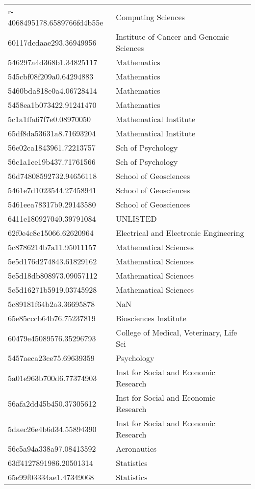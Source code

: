 \begin{tabular}{ll}
r-4068495178.6589766fd4b55e & Computing Sciences \\
60117dcdaae293.36949956 & Institute of Cancer and Genomic Sciences \\
546297a4d368b1.34825117 & Mathematics \\
545cbf08f209a0.64294883 & Mathematics \\
5460bda818e0a4.06728414 & Mathematics \\
5458ea1b073422.91241470 & Mathematics \\
5c1a1ffa67f7e0.08970050 & Mathematical Institute \\
65df8da53631a8.71693204 & Mathematical Institute \\
56e02ca1843961.72213757 & Sch of Psychology \\
56c1a1ee19b437.71761566 & Sch of Psychology \\
56d74808592732.94656118 & School of Geosciences \\
5461e7d1023544.27458941 & School of Geosciences \\
5461eea78317b9.29143580 & School of Geosciences \\
6411e180927040.39791084 & UNLISTED \\
62f0e4c8c15066.62620964 & Electrical and Electronic Engineering \\
5c8786214b7a11.95011157 & Mathematical Sciences \\
5e5d176d274843.61829162 & Mathematical Sciences \\
5e5d18db808973.09057112 & Mathematical Sciences \\
5e5d16271b5919.03745928 & Mathematical Sciences \\
5c89181f64b2a3.36695878 & NaN \\
65e85cccb64b76.75237819 & Biosciences Institute \\
60479e45089576.35296793 & College of Medical, Veterinary, Life Sci \\
5457aeca23ce75.69639359 & Psychology \\
5a01e963b700d6.77374903 & Inst for Social and Economic Research \\
56afa2dd45b450.37305612 & Inst for Social and Economic Research \\
5daec26e4b6d34.55894390 & Inst for Social and Economic Research \\
56c5a94a338a97.08413592 & Aeronautics \\
63ff4127891986.20501314 & Statistics \\
65e99f03334ae1.47349068 & Statistics \\

\end{tabular}
